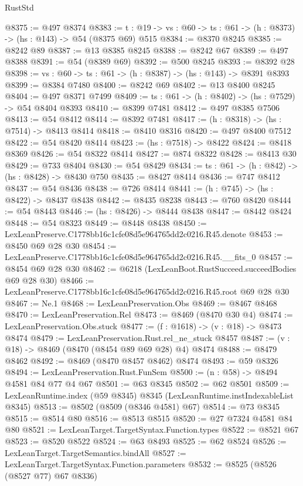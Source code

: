 \begin{lexlean}{RustStd}
\begin{coremodule}
@8375 := @497 @8374
@8383 := {t : @19} -> {vs : @60} -> {ts : @61} -> (h : @8373) -> (hs : @143) -> @54 (@8375 @69) @515
@8384 := @8370 @8245
@8385 := @8242 @89
@8387 := @13 @8385 @8245
@8388 := @8242 @67
@8389 := @497 @8388
@8391 := @54 (@8389 @69)
@8392 := @500 @8245
@8393 := @8392 @28
@8398 := {vs : @60} -> {ts : @61} -> (h : @8387) -> (hs : @143) -> @8391 @8393
@8399 := @8384 @7480
@8400 := @8242 @69
@8402 := @13 @8400 @8245
@8404 := @497 @8371 @7499
@8409 := {ts : @61} -> (h : @8402) -> (hs : @7529) -> @54 @8404 @8393
@8410 := @8399 @7481
@8412 := @497 @8385 @7506
@8413 := @54 @8412
@8414 := @8392 @7481
@8417 := (h : @8318) -> (hs : @7514) -> @8413 @8414
@8418 := @8410 @8316
@8420 := @497 @8400 @7512
@8422 := @54 @8420 @8414
@8423 := (hs : @7518) -> @8422
@8424 := @8418 @8369
@8426 := @54 @8322 @8414
@8427 := @874 @8322
@8428 := @8413 @30
@8429 := @733 @8404
@8430 := @54 @8429
@8434 := {ts : @61} -> (h : @842) -> (hs : @8428) -> @8430 @750
@8435 := @8427 @8414
@8436 := @747 @8412
@8437 := @54 @8436
@8438 := @726 @8414
@8441 := (h : @745) -> (hs : @8422) -> @8437 @8438
@8442 := @8435 @8238
@8443 := @760 @8420
@8444 := @54 @8443
@8446 := (hs : @8426) -> @8444 @8438
@8447 := @8442 @8424
@8448 := @54 @8323
@8449 := @8448 @8438
@8450 := LexLeanPreserve.C1778bb16c1cfe08d5e964765dd2c0216.R45.denote
@8453 := @8450 @69 @28 @30
@8454 := LexLeanPreserve.C1778bb16c1cfe08d5e964765dd2c0216.R45.__fits_0
@8457 := @8454 @69 @28 @30
@8462 := @6218 (LexLeanBoot.RustSucceed.succeedBodies @69 @28 @30)
@8466 := LexLeanPreserve.C1778bb16c1cfe08d5e964765dd2c0216.R45.root @69 @28 @30
@8467 := Ne.{1}
@8468 := LexLeanPreservation.Obs
@8469 := @8467 @8468
@8470 := LexLeanPreservation.Rel
@8473 := @8469 (@8470 @30 @4)
@8474 := LexLeanPreservation.Obs.stuck
@8477 := (f : @1618) -> (v : @18) -> @8473 @8474
@8479 := LexLeanPreservation.Rust.rel_ne_stuck @8457
@8487 := (v : @18) -> @8469 (@8470 (@8454 @89 @69 @28) @4) @8474
@8488 := @8479 @8462
@8492 := @8469 (@8470 @8457 @8462) @8474
@8493 := @59 @8326
@8494 := LexLeanPreservation.Rust.FunSem
@8500 := (n : @58) -> @8494 @4581 @84 @77 @4 @67
@8501 := @63 @8345
@8502 := @62 @8501
@8509 := LexLeanRuntime.index (@59 @8345) @8345 (LexLeanRuntime.instIndexableList @8345)
@8513 := @8502 (@8509 (@8346 @4581) @67)
@8514 := @73 @8345
@8515 := @8514 @80
@8516 := @8513 @8515
@8520 := @27 @7324 @4581 @84 @80
@8521 := LexLeanTarget.TargetSyntax.Function.types
@8522 := @8521 @67
@8523 := @8520 @8522
@8524 := @63 @8493
@8525 := @62 @8524
@8526 := LexLeanTarget.TargetSemantics.bindAll
@8527 := LexLeanTarget.TargetSyntax.Function.parameters
@8532 := @8525 (@8526 (@8527 @77) @67 @8336)

\end{coremodule}
\end{lexlean}
